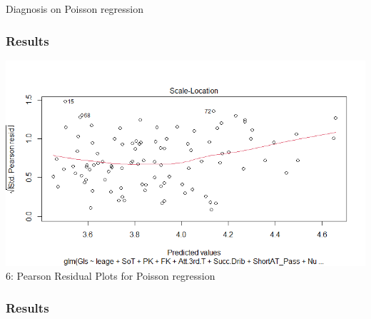 \documentclass[11pt]{beamer}
\begin{document}
\begin{frame}{Diagnosis on Poisson regression}
	\frametitle{Results}
	\includegraphics[scale=0.5]{gls5}
	\figurename 6: Pearson Residual Plots for Poisson regression
\end{frame}

\begin{frame}
	\frametitle{Results}
	
\end{frame}
\end{document}
